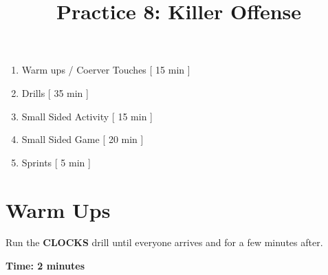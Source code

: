 \documentclass[10pt,letterpaper]{article}
\title{\vspace{-.5in}Practice 8: Killer Offense}
\author{\vspace{-.5in}}
\date{\vspace{-.5in}}
\newenvironment{agendablock}[1]{%
    \tcolorbox[beamer,%
    noparskip,breakable,
    colback=LightGray,colframe=Black,%
    colbacklower=Gray!75!LightGray,%
    title=#1]}%
    {\endtcolorbox}
\begin{document}
\selectfont


\maketitle

\begin{agendablock}{Practice Activities}
    \begin{enumerate}
        \item Warm ups / Coerver Touches [ 15 min ]
        \item Drills [ 35 min ]
        \item Small Sided Activity [ 15 min ]
        \item Small Sided Game [ 20 min ]
        \item Sprints [ 5 min ] 
    \end{enumerate}
\end{agendablock}

\section{Warm Ups}
Run the \textbf{CLOCKS} drill until everyone arrives and for a few minutes after.

\textbf{Time: 2 minutes}

\end{document}

